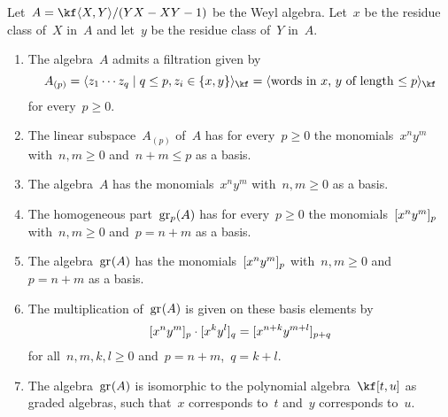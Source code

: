 \begin{theorem}
	\label{results about the weyl algerba}
	Let~$A = \kf\gen{X,Y} / \ideal{YX - XY - 1}$ be the Weyl algebra.
	Let~$x$ be the residue class of~$X$ in~$A$ and let~$y$ be the residue class of~$Y$ in~$A$.
	\begin{enumerate}
		\item
			The algebra~$A$ admits a filtration given by
			\[
				A_{(p)}
				=
				\gen{
					z_1 \dotsm z_q
					\suchthat
					q \leq p,
					z_i \in \{ x, y \}
				}_{\kf}
				=
				\gen{
					\text{words in~$x$,~$y$ of length~$\leq p$}
				}_{\kf}
			\]
			for every~$p \geq 0$.
		\item
			\label{basis for filtration of weyl algebra}
			The linear subspace~$A_{(p)}$ of~$A$ has for every~$p \geq 0$ the monomials~$x^n y^m$ with~$n, m \geq 0$ and~$n + m \leq p$ as a basis.
		\item
			The algebra~$A$ has the monomials~$x^n y^m$ with~$n, m \geq 0$ as a basis.
		\item
			\label{homogeneous basis for associated graded of weyl algebra}
			The homogeneous part~$\gr[p](A)$ has for every~$p \geq 0$ the monomials~$\lbrack x^n y^m \rbrack_p$ with~$n, m \geq 0$ and~$p = n+m$ as a basis.
		\item
			\label{basis for associated graded of weyl algebra}
			The algebra~$\gr(A)$ has the monomials~$\lbrack x^n y^m \rbrack_p$ with~$n, m \geq 0$ and~$p = n+m$ as a basis.
		\item
			\label{multiplication on basis of associated graded of weyl algebra}
			The multiplication of~$\gr(A)$ is given on these basis elements by
			\[
				\lbrack x^n y^m \rbrack_p \cdot \lbrack x^k y^l \rbrack_q
				=
				\lbrack x^{n+k} y^{m+l} \rbrack_{p+q}
			\]
			for all~$n, m, k, l \geq 0$ and~$p = n + m$,~$q = k + l$.
		\item
			The algebra~$\gr(A)$ is isomorphic to the polynomial algebra~$\kf[t,u]$ as graded algebras, such that~$x$ corresponds to~$t$ and~$y$ corresponds to~$u$.
	\end{enumerate}
\end{theorem}


